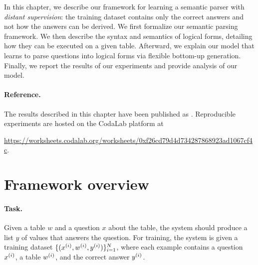 In this chapter, we describe our framework
for learning a semantic parser with \emph{distant supervision}:
the training dataset contains only the correct answers
and not how the answers can be derived.
We first formalize our semantic parsing framework.
We then describe the syntax and semantics of logical forms,
detailing how they can be executed on a given table.
Afterward, we explain our model that learns to parse
questions into logical forms via flexible bottom-up generation.
Finally, we report the results of our experiments
and provide analysis of our model.

\paragraph{Reference.}
The results described in this chapter have been published as
\cite{pasupat2015compositional}.
Reproducible experiments are hosted on the
CodaLab platform at
\begin{center}
\small
\url{https://worksheets.codalab.org/worksheets/0xf26cd79d4d734287868923ad1067cf4c}.
\end{center}


\section{Framework overview}

\paragraph{Task.}
Given a table $w$ and a question $x$ about the table,
the system should produce a list $y$ of values
that answers the question.
For training, the system is given a training dataset
$\{(x^{(i)}, w^{(i)}, y^{(i)})\}_{i=1}^N$,
where each example contains a question $x^{(i)}$,
a table $w^{(i)}$, and the correct answer $y^{(i)}$.

